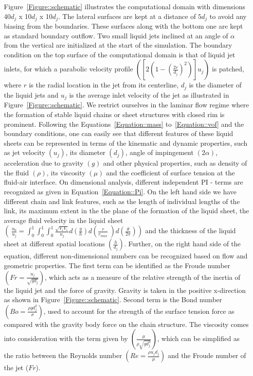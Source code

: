 \documentclass[%
aip,
sd,%
amsmath,amssymb,
preprint,%
author-year,%
]{revtex4-1}
\begin{document}
Figure~\ref{Figure::schematic} illustrates the computational domain with dimensions 40$d_j$ x 10$d_j$ x 10$d_j$. The lateral surfaces are kept at a distance of $5d_j$ to avoid any biasing from the boundaries. These surfaces along with the bottom one are kept as standard boundary outflow. Two small liquid jets inclined at an angle of $\alpha$ from the vertical are initialized at the start of the simulation. The boundary condition on the top surface of the computational domain is that of liquid jet inlets, for which a parabolic velocity profile $\left(\left[2\left(1 - \left(\frac{2r}{d_j}\right)^2\right) \right]u_j\right)$ is patched, where $r$ is the radial location in the jet from its centerline, $d_j$ is the diameter of the liquid jets and $u_j$ is the average inlet velocity of the jet as illustrated in Figure~\ref{Figure::schematic}. We restrict ourselves in the laminar flow regime where the formation of stable liquid chains or sheet structures with closed rim is prominent. Following the Equations~\ref{Equation::mass} to~\ref{Equation::vof} and the boundary conditions, one can easily see that different features of these liquid sheets can be represented in terms of the kinematic and dynamic properties, such as jet velocity $\left(u_j\right)$, its diameter $\left(d_j\right)$, angle of impingement $\left(2\alpha\right)$, acceleration due to gravity $\left(g\right)$ and other physical properties, such as density of the fluid $\left(\rho\right)$, its viscosity $\left(\mu\right)$ and the coefficient of surface tension at the fluid-air interface. On dimensional analysis, different independent PI - terms are recognized as given in Equation~\ref{Equation::Pi}. On the left hand side we have different chain and link features, such as the length of individual lengths of the link, its maximum extent in the the plane of the formation of the liquid sheet, the average fluid velocity in the liquid sheet $\left(\:\frac{u_0}{u_j} = \int_{0}^{1}\int_{0}^{1}\int_{0}^{1}\frac{\sqrt{V_iV_i}}{u_j}d\left(\frac{y}{h}\right)d\left(\frac{r}{r_{max}}\:\right)d\left(\frac{\theta}{2\pi}\right) \right)$ and the thickness of the liquid sheet at different spatial locations $\left(\frac{h}{d_j}\right)$. Further, on the right hand side of the equation, different non-dimensional numbers can be recognized based on flow and geometric properties. The first term can be identified as the Froude number $\left(Fr = \frac{u_j}{\sqrt{gd_j}}\right)$, which acts as a measure of the relative strength of the inertia of the liquid jet and the force of gravity. Gravity is taken in the positive x-direction as shown in Figure~\ref{Figure::schematic}. Second term is the Bond number $\left(Bo = \frac{\rho gd_j^2}{\sigma}\right)$, used to account for the strength of the surface tension force as compared with the gravity body force on the chain structure. The viscosity comes into consideration with the term given by $\left(\frac{\mu}{\rho\sqrt{gd_j^3}}\right)$, which can be simplified as the ratio between the Reynolds number $\left(Re = \frac{\rho u_jd_j}{\mu}\right)$ and the Froude number of the jet ($Fr$).
\end{document}
